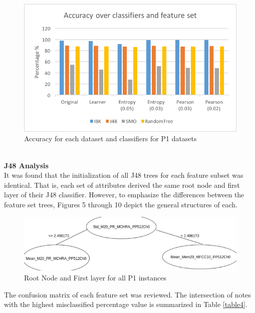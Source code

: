 \documentclass{article}
\begin{document}
\begin{figure}[h]
\includegraphics[scale=.65]{accuracy_p1}
 \caption{Accuracy for each dataset and classifiers for P1 datasets}
\label{figure2}
\end{figure}
\\\textbf{J48 Analysis}\\
It was found that the initialization of all J48 trees for each feature subset was identical. That is, each set of attributes derived the same root node and first layer of their J48 classifier. However, to emphasize the differences between the feature set trees, Figures 5 through 10 depict the general structures of each.
\begin{figure}[h]
\includegraphics[scale=.45]{treenotes}
 \caption{Root Node and First layer for all P1 instances}
\label{figure3}
\end{figure}

The confusion matrix of each feature set was reviewed. The intersection of notes with the highest misclassified percentage value is summarized in Table \ref{table4}.
\end{document}
